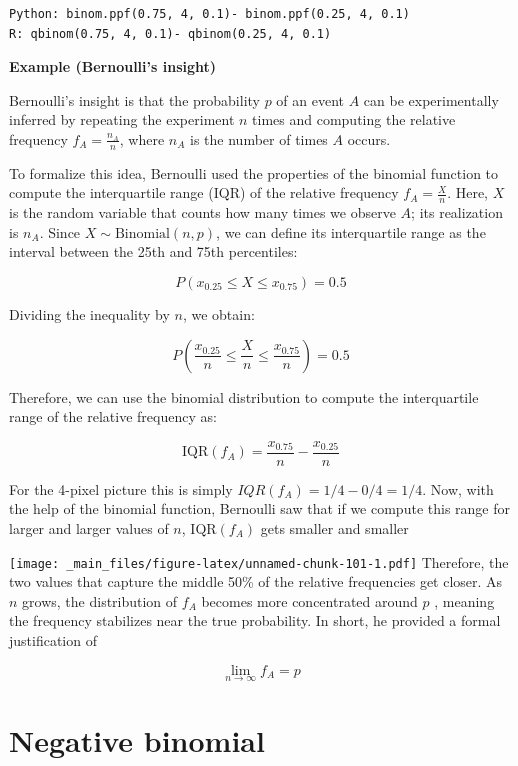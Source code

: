 \documentclass[
]{book}
\begin{document}
\begin{verbatim}
Python: binom.ppf(0.75, 4, 0.1)- binom.ppf(0.25, 4, 0.1)
R: qbinom(0.75, 4, 0.1)- qbinom(0.25, 4, 0.1)
\end{verbatim}

\textbf{Example (Bernoulli's insight)}

Bernoulli's insight is that the probability \(p\) of an event \(A\) can be experimentally inferred by repeating the experiment \(n\) times and computing the relative frequency \(f_A = \frac{n_A}{n}\), where \(n_A\) is the number of times \(A\) occurs.

To formalize this idea, Bernoulli used the properties of the binomial function to compute the interquartile range (IQR) of the relative frequency \(f_A = \frac{X}{n}\). Here, \(X\) is the random variable that counts how many times we observe \(A\); its realization is \(n_A\). Since \(X \sim \text{Binomial}(n, p)\), we can define its interquartile range as the interval between the 25th and 75th percentiles:

\[
P(x_{0.25} \leq X \leq x_{0.75}) = 0.5
\]

Dividing the inequality by \(n\), we obtain:

\[
P\left(\frac{x_{0.25}}{n} \leq \frac{X}{n} \leq \frac{x_{0.75}}{n}\right) = 0.5
\]

Therefore, we can use the binomial distribution to compute the interquartile range of the relative frequency as:

\[
\text{IQR}(f_A) = \frac{x_{0.75}}{n} - \frac{x_{0.25}}{n}
\]

For the 4-pixel picture this is simply \(IQR(f_A)=1/4-0/4=1/4\). Now, with the help of the binomial function, Bernoulli saw that if we compute this range for larger and larger values of \(n\), \(\text{IQR}(f_A)\) gets smaller and smaller

\texttt{[image: \_main\_files/figure-latex/unnamed-chunk-101-1.pdf]}
Therefore, the two values that capture the middle 50\% of the relative frequencies get closer. As \(n\) grows, the distribution of \(f_A\) becomes more concentrated around \(p\) \citep{Bernoulli2006}, meaning the frequency stabilizes near the true probability. In short, he provided a formal justification of

\[
\lim_{n \rightarrow \infty} f_A = p
\]

\hypertarget{negative-binomial}{%
\section{Negative binomial}\label{negative-binomial}}
\end{document}
